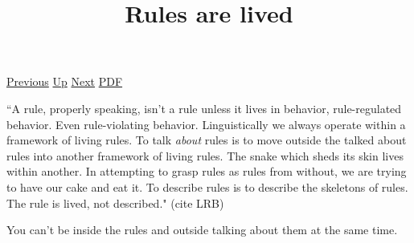 \documentclass[12pt,a4paper]{report}
\begin{document}
 \href{doc/phil/People/Sellars/Quotes/Nondescriptiveconcepts.html}{Previous} 
 \href{doc/phil/People/Sellars/Quotes.html}{Up} 
 \href{doc/phil/People/Sellars/Quotes/ScientiumMensura.html}{Next} 
 \href{doc/phil/People/Sellars/Quotes/Rulesarelived.pdf}{PDF} 
\title{Rules are lived}
``A rule, properly speaking, isn't a rule unless it lives in behavior,
rule-regulated behavior. Even rule-violating behavior. Linguistically we always
operate within a framework of living rules. To talk \emph{about} rules is to
move outside the talked about rules into another framework of living rules. The
snake which sheds its skin lives within another. In attempting to grasp rules as
rules from without, we are trying to have our cake and eat it. To describe rules
is to describe the skeletons of rules. The rule is lived, not described."
(cite LRB)

You can't be inside the rules and outside talking about them at the same time.
\end{document}
